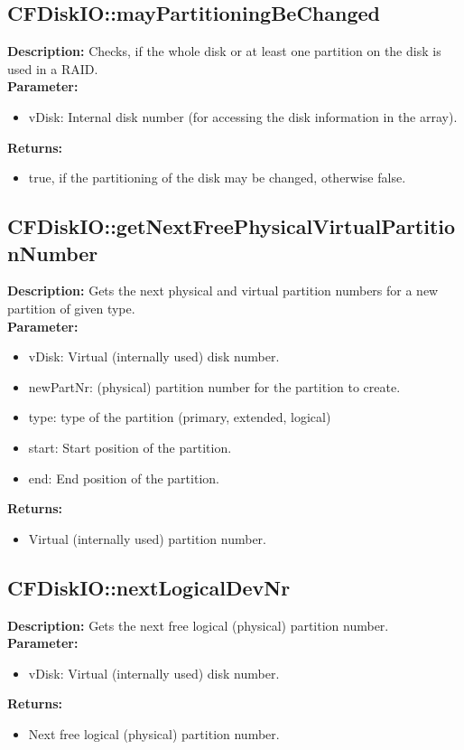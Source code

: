 \subsection{CFDiskIO::mayPartitioningBeChanged}
\textbf{Description:} Checks, if the whole disk or at least one partition on the disk is used in a RAID.\\
\textbf{Parameter:}
\begin{itemize}
\item vDisk: Internal disk number (for accessing the disk information in the array).
\end{itemize}
\textbf{Returns:}
\begin{itemize}
\item true, if the partitioning of the disk may be changed, otherwise false.
\end{itemize}

\subsection{CFDiskIO::getNextFreePhysicalVirtualPartitionNumber}
\textbf{Description:} Gets the next physical and virtual partition numbers for a new partition of given type.\\
\textbf{Parameter:}
\begin{itemize}
\item vDisk: Virtual (internally used) disk number.
\item newPartNr: (physical) partition number for the partition to create.
\item type: type of the partition (primary, extended, logical)
\item start: Start position of the partition.
\item end: End position of the partition.
\end{itemize}
\textbf{Returns:}
\begin{itemize}
\item Virtual (internally used) partition number.
\end{itemize}

\subsection{CFDiskIO::nextLogicalDevNr}
\textbf{Description:} Gets the next free logical (physical) partition number.\\
\textbf{Parameter:}
\begin{itemize}
\item vDisk: Virtual (internally used) disk number.
\end{itemize}
\textbf{Returns:}
\begin{itemize}
\item Next free logical (physical) partition number.
\end{itemize}


